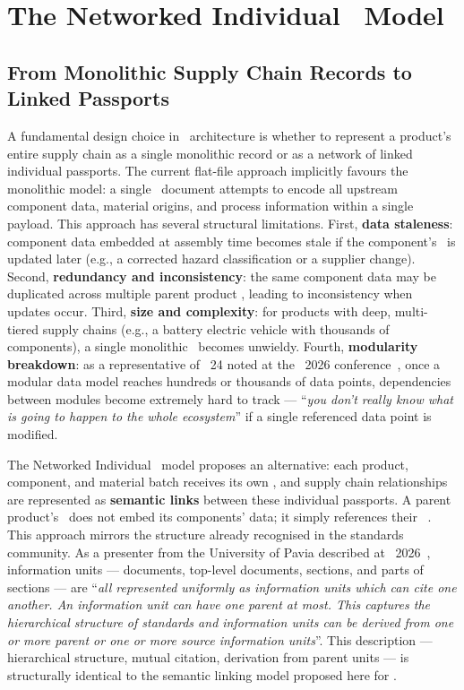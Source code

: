 \section{The Networked Individual \DPP\ Model}

\subsection{From Monolithic Supply Chain Records to Linked Passports}

A fundamental design choice in \DPP\ architecture is whether to represent a
product's entire supply chain as a single monolithic record or as a network of
linked individual passports. The current flat-file approach implicitly favours
the monolithic model: a single \DPP\ document attempts to encode all upstream
component data, material origins, and process information within a single
payload. This approach has several structural limitations. First, \textbf{data
staleness}: component data embedded at assembly time becomes stale if the
component's \DPP\ is updated later (e.g., a corrected hazard classification or a
supplier change). Second, \textbf{redundancy and inconsistency}: the same
component data may be duplicated across multiple parent product \DPPs, leading
to inconsistency when updates occur. Third, \textbf{size and complexity}: for
products with deep, multi-tiered supply chains (e.g., a battery electric vehicle
with thousands of components), a single monolithic \DPP\ becomes unwieldy.
Fourth, \textbf{modularity breakdown}: as a representative of \JTC~24 noted at
the \DPPforEU~2026 conference~\cite{dpp4eu2026_day1}, once a modular data model
reaches hundreds or thousands of data points, dependencies between modules
become extremely hard to track --- ``\textit{you don't really know what is going
to happen to the whole ecosystem}'' if a single referenced data point is
modified.

The Networked Individual \DPP\ model proposes an alternative: each product,
component, and material batch receives its own \DPP, and supply chain
relationships are represented as \textbf{semantic links} between these
individual passports. A parent product's \DPP\ does not embed its components'
data; it simply references their \DPP\ \URIs. This approach mirrors the
structure already recognised in the standards community. As a presenter from the
University of Pavia described at \DPPforEU~2026~\cite{dpp4eu2026_day1},
information units --- documents, top-level documents, sections, and parts of
sections --- are ``\textit{all represented uniformly as information units which
can cite one another. An information unit can have one parent at most. This
captures the hierarchical structure of standards and information units can be
derived from one or more parent or one or more source information units}''. This
description --- hierarchical structure, mutual citation, derivation from parent
units --- is structurally identical to the semantic linking model proposed here
for \DPPs.

